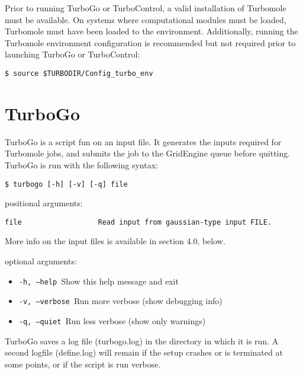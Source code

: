 Prior to running TurboGo or TurboControl, a valid installation of
Turbomole must be available. On systems where computational modules must
be loaded, Turbomole must have been loaded to the environment.
Additionally, running the Turbomole environment configuration is
recommended but not required prior to launching TurboGo or TurboControl:

\begin{center}
\begin{verbatim}
$ source $TURBODIR/Config_turbo_env
\end{verbatim}
\end{center}

\section{TurboGo}

TurboGo is a script fun on an input file. It generates the inputs
required for Turbomole jobs, and submits the job to the GridEngine queue
before quitting. TurboGo is run with the following syntax:

\begin{center}
\begin{verbatim}
$ turbogo [-h] [-v] [-q] file
\end{verbatim}
\end{center}

positional arguments:

\begin{Verbatim}[baselinestretch=0.75]
file                  Read input from gaussian-type input FILE.
\end{Verbatim}

More info on the input files is available in section 4.0, below.

optional arguments:

\begin{itemize}
\item \texttt{-h, --help            }Show this help message and exit
\item \texttt{-v, --verbose         }Run more verbose (show debugging info)
\item \texttt{-q, --quiet           }Run less verbose (show only warnings)
\end{itemize}

TurboGo saves a log file (turbogo.log) in the directory in which it is
run. A second logfile (define.log) will remain if the setup crashes or
is terminated at some points, or if the script is run verbose.

